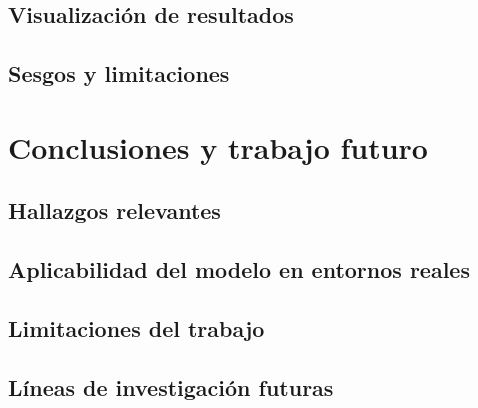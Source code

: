 \documentclass[12pt]{article}
\begin{document}
	\subsection{Visualización de resultados}
	
	
	\subsection{Sesgos y limitaciones}

\newpage
\section{\label{trabajo futuro}Conclusiones y trabajo futuro}

	\subsection{Hallazgos relevantes}
	
	\subsection{Aplicabilidad del modelo en entornos reales}
	
	\subsection{Limitaciones del trabajo}
	
	\subsection{Líneas de investigación futuras}

\newpage
\end{document}
